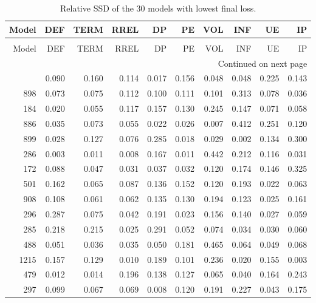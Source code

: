 \begin{longtable}{rrrrrrrrrr}
\caption{Relative SSD of the 30 models with lowest final loss.}
\label{tab:SSD_loss_FP_30}\\
\toprule
 Model &   DEF &  TERM &  RREL &    DP &    PE &   VOL &   INF &    UE &    IP \\
\midrule
\endfirsthead
\caption[]{Relative SSD of the 30 models with lowest final loss.} \\
\toprule
 Model &   DEF &  TERM &  RREL &    DP &    PE &   VOL &   INF &    UE &    IP \\
\midrule
\endhead
\midrule
\multicolumn{10}{r}{{Continued on next page}} \\
\midrule
\endfoot

\bottomrule
\endlastfoot
   491 & 0.090 & 0.160 & 0.114 & 0.017 & 0.156 & 0.048 & 0.048 & 0.225 & 0.143 \\
   898 & 0.073 & 0.075 & 0.112 & 0.100 & 0.111 & 0.101 & 0.313 & 0.078 & 0.036 \\
   184 & 0.020 & 0.055 & 0.117 & 0.157 & 0.130 & 0.245 & 0.147 & 0.071 & 0.058 \\
   886 & 0.035 & 0.073 & 0.055 & 0.022 & 0.026 & 0.007 & 0.412 & 0.251 & 0.120 \\
   899 & 0.028 & 0.127 & 0.076 & 0.285 & 0.018 & 0.029 & 0.002 & 0.134 & 0.300 \\
   286 & 0.003 & 0.011 & 0.008 & 0.167 & 0.011 & 0.442 & 0.212 & 0.116 & 0.031 \\
   172 & 0.088 & 0.047 & 0.031 & 0.037 & 0.032 & 0.120 & 0.174 & 0.146 & 0.325 \\
   501 & 0.162 & 0.065 & 0.087 & 0.136 & 0.152 & 0.120 & 0.193 & 0.022 & 0.063 \\
   908 & 0.108 & 0.061 & 0.062 & 0.135 & 0.130 & 0.194 & 0.123 & 0.025 & 0.161 \\
   296 & 0.287 & 0.075 & 0.042 & 0.191 & 0.023 & 0.156 & 0.140 & 0.027 & 0.059 \\
   285 & 0.218 & 0.215 & 0.025 & 0.291 & 0.052 & 0.074 & 0.034 & 0.030 & 0.060 \\
   488 & 0.051 & 0.036 & 0.035 & 0.050 & 0.181 & 0.465 & 0.064 & 0.049 & 0.068 \\
  1215 & 0.157 & 0.129 & 0.010 & 0.189 & 0.101 & 0.236 & 0.020 & 0.155 & 0.003 \\
   479 & 0.012 & 0.014 & 0.196 & 0.138 & 0.127 & 0.065 & 0.040 & 0.164 & 0.243 \\
   297 & 0.099 & 0.067 & 0.069 & 0.008 & 0.120 & 0.191 & 0.227 & 0.043 & 0.175 \\

\end{longtable}
